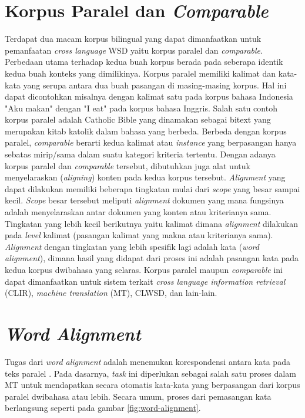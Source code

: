 \section{Korpus Paralel dan \textit{Comparable}}
Terdapat dua macam korpus bilingual yang dapat dimanfaatkan untuk pemanfaatan \textit{cross language } WSD yaitu korpus paralel dan \textit{comparable}. Perbedaan utama terhadap kedua buah korpus berada pada seberapa identik kedua buah konteks yang dimilikinya. Korpus paralel memiliki kalimat dan kata-kata yang serupa antara dua buah pasangan di masing-masing korpus. Hal ini dapat dicontohkan misalnya dengan kalimat satu pada korpus bahasa Indonesia "Aku makan" dengan "I eat" pada korpus bahasa Inggris. Salah satu contoh korpus paralel adalah Catholic Bible yang dinamakan sebagai bitext \citep{rudnick2011towards} yang merupakan kitab katolik dalam bahasa yang berbeda. Berbeda dengan korpus paralel, \textit{comparable} berarti kedua kalimat atau \textit{instance} yang berpasangan hanya sebatas mirip/sama dalam suatu kategori kriteria tertentu. Dengan adanya korpus paralel dan \textit{comparable} tersebut, dibutuhkan juga alat untuk menyelaraskan (\textit{aligning}) konten pada kedua korpus tersebut. \textit{Alignment} yang dapat dilakukan memiliki beberapa tingkatan mulai dari \textit{scope} yang besar sampai kecil. \textit{Scope} besar tersebut meliputi \textit{alignment} dokumen yang mana fungsinya adalah menyelaraskan antar dokumen yang konten atau kriterianya sama. Tingkatan yang lebih kecil berikutnya yaitu kalimat dimana \textit{alignment} dilakukan pada \textit{level} kalimat (pasangan kalimat yang makna atau kriterianya sama). \textit{Alignment} dengan tingkatan yang lebih spesifik lagi adalah kata (\textit{word alignment}), dimana hasil yang didapat dari proses ini adalah pasangan kata pada kedua korpus dwibahasa yang selaras. Korpus paralel maupun \textit{comparable} ini dapat dimanfaatkan untuk sistem terkait  \textit{cross language information retrieval} (CLIR), \textit{machine translation} (MT), CLWSD, dan lain-lain.
\section{\textit{Word Alignment}}
Tugas dari \textit{word alignment} adalah menemukan korespondensi antara kata pada teks paralel 
\citep{mihalcea2003evaluation}. Pada dasarnya, \textit{task} ini diperlukan sebagai salah satu proses dalam MT untuk mendapatkan secara otomatis kata-kata yang berpasangan dari korpus paralel dwibahasa atau lebih. Secara umum, proses dari pemasangan kata berlangsung seperti pada gambar \ref{fig:word-alignment}.

